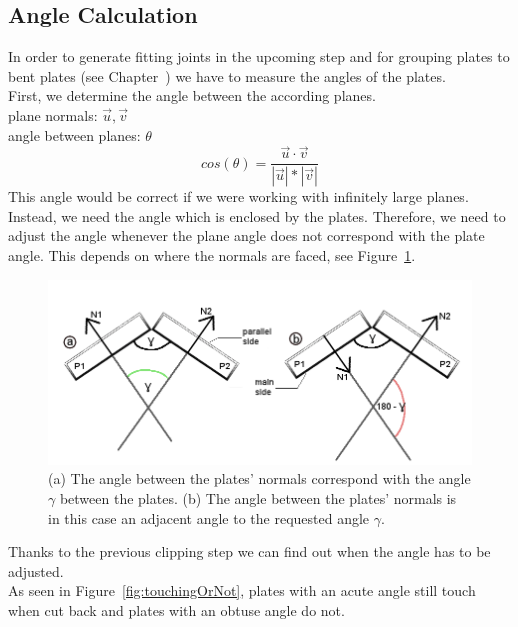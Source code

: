 \documentclass[../ClassicThesis.tex]{subfiles}
\begin{document}
\subsection{Angle Calculation}\label{angleCalculation}
In order to generate fitting joints in the upcoming step and for grouping plates to bent plates (see Chapter~) we have to measure the angles of the plates.\\
First, we determine the angle between the according planes.\\
plane normals: $\vec{u}, \vec{v}$\\
angle between planes: $\theta$
$$ cos(\theta) = \frac{\vec{u} \cdot \vec{v}}{|\vec{u}| * |\vec{v}|}$$
This angle would be correct if we were working with infinitely large planes. Instead, we need the angle which is enclosed by the plates. Therefore, we need to adjust the angle whenever the plane angle does not correspond with the plate angle. This depends on where the normals are faced, see Figure~\ref{fig:wrongAngle}.
\begin{figure}[!ht]
\centering
\includegraphics[width= 1\columnwidth]{Images/anglesExamplesSmall.png}
\caption{(a) The angle between the plates' normals correspond with the angle $\gamma$ between the plates. (b) The angle between the plates' normals is in this case an adjacent angle to the requested angle $\gamma$.}
\label{fig:wrongAngle}
\end{figure}
Thanks to the previous clipping step we can find out when the angle has to be adjusted.\\
As seen in Figure~\ref{fig:touchingOrNot}, plates with an acute angle still touch when cut back and plates with an obtuse angle do not.
\end{document}
